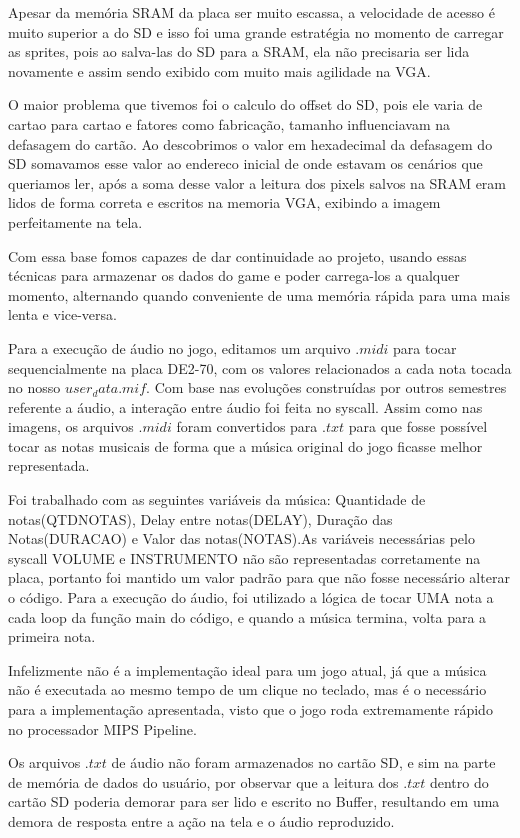 \documentclass{vgtc}                          %
\begin{document}
Apesar da memória SRAM da placa ser muito escassa, a velocidade de acesso é muito superior a do SD e isso foi uma grande estratégia no momento de carregar as sprites, pois ao salva-las do SD para a SRAM, ela não precisaria ser lida novamente e assim sendo exibido com muito mais agilidade na VGA.  

O maior problema que tivemos foi o calculo do offset do SD, pois ele varia de cartao para cartao e fatores como fabricação, tamanho influenciavam na defasagem do cartão. Ao descobrimos o valor em hexadecimal da defasagem do SD somavamos esse valor ao endereco inicial de onde estavam os cenários que queriamos ler, após a soma desse valor a leitura dos pixels salvos na SRAM eram lidos de forma correta e escritos na memoria VGA, exibindo a imagem perfeitamente na tela.

Com essa base fomos capazes de dar continuidade ao projeto, usando essas técnicas para armazenar os dados do game e poder carrega-los a qualquer momento, alternando quando conveniente de uma memória rápida para uma mais lenta e vice-versa.

Para a execução de áudio no jogo, editamos um arquivo $.midi$ para tocar sequencialmente na placa DE2-70, com os valores relacionados a cada nota tocada no nosso $user_data.mif$. Com base nas evoluções construídas por outros semestres referente a áudio, a interação entre áudio foi feita no syscall. Assim como nas imagens, os arquivos $.midi$ foram convertidos para $.txt$ para que fosse possível tocar as notas musicais de forma que a música original do jogo ficasse melhor representada.

Foi trabalhado com as seguintes variáveis da música: Quantidade de notas(QTDNOTAS), Delay entre notas(DELAY), Duração das Notas(DURACAO) e Valor das notas(NOTAS).As variáveis necessárias pelo syscall VOLUME e INSTRUMENTO não são representadas corretamente na placa, portanto foi mantido um valor padrão para que não fosse necessário alterar o código. Para a execução do áudio, foi utilizado a lógica de tocar UMA nota a cada loop da função main do código, e quando a música termina, volta para a primeira nota. 

Infelizmente não é a implementação ideal para um jogo atual, já que a música não é executada ao mesmo tempo de um clique no teclado, mas é o necessário para a implementação apresentada, visto que o jogo roda extremamente rápido no processador MIPS Pipeline. 

Os arquivos $.txt$ de áudio não foram armazenados no cartão SD, e sim na parte de memória de dados do usuário, por observar que a leitura dos $.txt$ dentro do cartão SD poderia demorar para ser lido e escrito no Buffer, resultando em uma demora de resposta entre a ação na tela e o áudio reproduzido.
\end{document}
